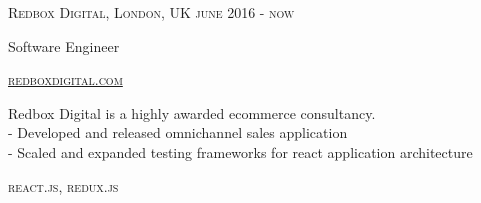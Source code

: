 {
  \textsc{\small{Redbox Digital, London, UK
    \hfill
      {\raggedleft
        june 2016 - now
      } \\
    }
  }
  {\raggedright\large {
      Software Engineer
  }}

  \textsc{\small\href{http://www.redboxdigital.com}{redboxdigital.com}}

  \normalsize{\raggedright
    Redbox Digital is a highly awarded ecommerce consultancy. \\
    - Developed and released omnichannel sales application \\
    - Scaled and expanded testing frameworks for react application architecture \\
  }

  \textsc{\small{\color{highlight}
    react.js,
    redux.js
  }}
}
